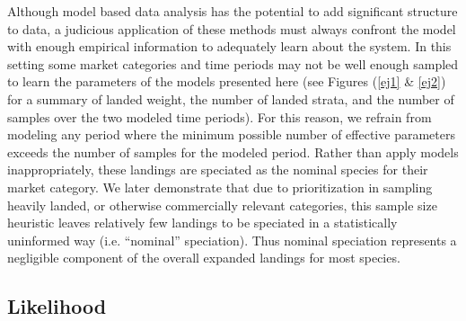 \documentclass[12pt]{article}
\begin{document}
%
Although model based data analysis has the potential to add significant
structure to data, a judicious application of these methods must always
confront the model with enough empirical information to adequately learn
about the system. In this setting some market categories and time
periods may not be well enough sampled to learn the parameters of the
models presented here (see Figures (\ref{ej1} \& \ref{ej2}) for a summary of 
landed weight, the number of landed strata, and the number of samples over the 
two modeled time periods). For this reason, we refrain from modeling any 
period where the minimum possible number of effective parameters exceeds the 
number of samples for the modeled period. Rather than apply models 
inappropriately, these landings are speciated as the nominal species for their 
market category. We later demonstrate that due to prioritization in sampling 
heavily landed, or otherwise commercially relevant categories, this sample 
size heuristic leaves relatively few landings to be speciated in a 
statistically uninformed way (i.e. ``nominal'' speciation). Thus nominal 
speciation represents a negligible component of the overall expanded landings 
for most species.




%
%
\subsection{Likelihood}
%
%
\end{document}
